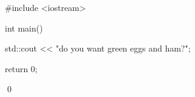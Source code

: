 \begin{console}
#include <iostream>

int main()
{
    std::cout << "do you want green eggs and ham?\n";

    return 0;
}
\end{console}
\qed    
